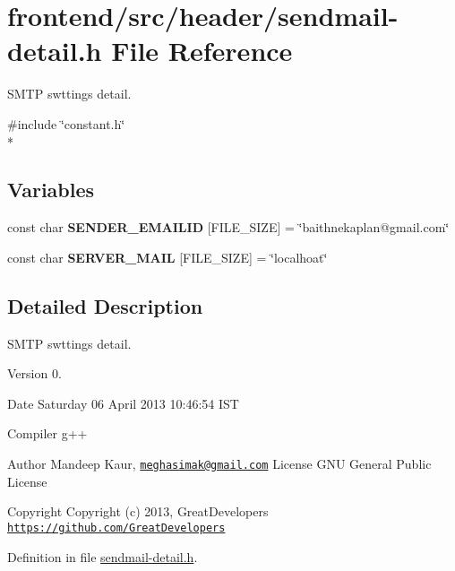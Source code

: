 \hypertarget{sendmail-detail_8h}{\section{frontend/src/header/sendmail-\/detail.h File Reference}
\label{sendmail-detail_8h}
}


S\-M\-T\-P swttings detail.  


{\ttfamily \#include \char`\"{}constant.\-h\char`\"{}}\\*
\subsection*{Variables}
\begin{DoxyCompactItemize}
\item 
\hypertarget{sendmail-detail_8h_a6a17dd6df02d3a5118873bc84ce9801d}{const char {\bfseries S\-E\-N\-D\-E\-R\-\_\-\-E\-M\-A\-I\-L\-I\-D} \mbox{[}F\-I\-L\-E\-\_\-\-S\-I\-Z\-E\mbox{]} = \char`\"{}baithnekaplan@gmail.\-com\char`\"{}}\label{sendmail-detail_8h_a6a17dd6df02d3a5118873bc84ce9801d}

\item 
\hypertarget{sendmail-detail_8h_a5a43d9760874d06771eec35419dad507}{const char {\bfseries S\-E\-R\-V\-E\-R\-\_\-\-M\-A\-I\-L} \mbox{[}F\-I\-L\-E\-\_\-\-S\-I\-Z\-E\mbox{]} = \char`\"{}localhoat\char`\"{}}\label{sendmail-detail_8h_a5a43d9760874d06771eec35419dad507}

\end{DoxyCompactItemize}


\subsection{Detailed Description}
S\-M\-T\-P swttings detail. \begin{DoxyVersion}{Version}
0. 
\end{DoxyVersion}
\begin{DoxyDate}{Date}
Saturday 06 April 2013 10\-:46\-:54 I\-S\-T\par
 Compiler g++
\end{DoxyDate}
\begin{DoxyAuthor}{Author}
Mandeep Kaur, \href{mailto:meghasimak@gmail.com}{\tt meghasimak@gmail.\-com} License G\-N\-U General Public License 
\end{DoxyAuthor}
\begin{DoxyCopyright}{Copyright}
Copyright (c) 2013, Great\-Developers \href{https://github.com/GreatDevelopers}{\tt https\-://github.\-com/\-Great\-Developers} 
\end{DoxyCopyright}


Definition in file \hyperlink{sendmail-detail_8h_source}{sendmail-\/detail.\-h}.

